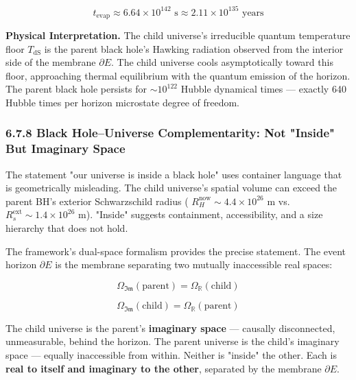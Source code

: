 \documentclass[11pt,a4paper]{article}
\theoremstyle{definition}
\theoremstyle{remark}
\begin{document}
\begin{equation}
t_{\text{evap}} \approx 6.64 \times 10^{142} \text{ s} \approx 2.11 \times 10^{135} \text{ years}
\end{equation}


\textbf{Physical Interpretation.} The child universe's irreducible quantum temperature floor $T_{\text{dS}}$ is the parent black hole's Hawking radiation observed from the interior side of the membrane $\partial E$. The child universe cools asymptotically toward this floor, approaching thermal equilibrium with the quantum emission of the horizon. The parent black hole persists for $\sim 10^{122}$ Hubble dynamical times — exactly 640 Hubble times per horizon microstate degree of freedom.

\subsubsection{6.7.8 Black Hole–Universe Complementarity: Not "Inside" But Imaginary Space}

The statement "our universe is inside a black hole" uses container language that is geometrically misleading. The child universe's spatial volume can exceed the parent BH's exterior Schwarzschild radius ( $R_H^{\text{now}} \sim 4.4 \times 10^{26}$ m vs. $R_s^{\text{ext}} \sim 1.4 \times 10^{26}$ m). "Inside" suggests containment, accessibility, and a size hierarchy that does not hold.

The framework's dual-space formalism provides the precise statement. The event horizon $\partial E$ is the membrane separating two mutually inaccessible real spaces:


\begin{equation}
\boxed{\Omega_{\mathfrak{Im}}(\text{parent}) = \Omega_{\mathbb{R}}(\text{child})}
\end{equation}



\begin{equation}
\boxed{\Omega_{\mathfrak{Im}}(\text{child}) = \Omega_{\mathbb{R}}(\text{parent})}
\end{equation}


The child universe is the parent's \textbf{imaginary space} — causally disconnected, unmeasurable, behind the horizon. The parent universe is the child's imaginary space — equally inaccessible from within. Neither is "inside" the other. Each is \textbf{real to itself and imaginary to the other}, separated by the membrane $\partial E$.
\end{document}
